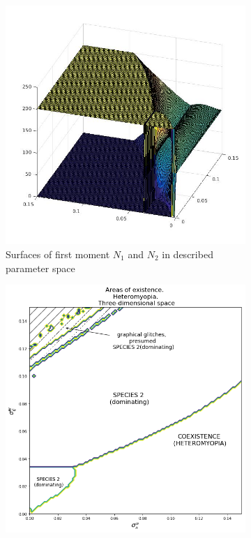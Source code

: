 \begin{figure}[ht]
	\centering
	\begin{subfigure}{.5\textwidth}
		\centering
		\includegraphics[width=.93\linewidth]{N1N2hm08D3.jpg}
		\caption{Surfaces of first moment \(N_1\) and \(N_2\) in described parameter space}
		\label{fig:hmd3:sub1}
	\end{subfigure}%
	\begin{subfigure}{.5\textwidth}
		\centering
		\includegraphics[width=.93\linewidth]{arhm08d3.png}

\end{subfigure}
\end{figure}
